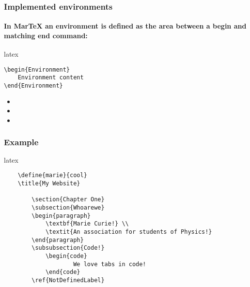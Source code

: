 \subsubsection{Implemented environments}
\paragraph{In MarTeX an environment is defined as the area between a begin and matching end command:}
\begin{code}{latex}
\begin{verbatim}
\begin{Environment} 
    Environment content
\end{Environment}
\end{verbatim} 
\end{code}

\begin{itemize}
    \item{}
    \item{}
    \item{}
\end{itemize}


\subsubsection{Example}
\begin{code}{latex} 
\begin{verbatim}
    \define{marie}{cool}
    \title{My Website}
    
        \section{Chapter One}
        \subsection{Whoarewe}
        \begin{paragraph}
            \textbf{Marie Curie!} \\
            \textit{An association for students of Physics!}
        \end{paragraph}
        \subsubsection{Code!}
            \begin{code}
                    We love tabs in code!
            \end{code}       
        \ref{NotDefinedLabel}
     
\end{verbatim} 
\end{code}

